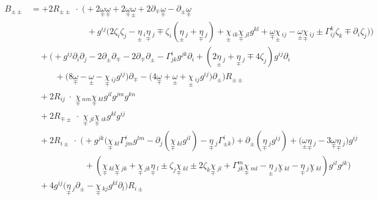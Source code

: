 \documentclass[a4paper,11pt]{article}
\numberwithin{equation}{section}
\theoremstyle{definition}
\begin{document}
\begin{align*}
    B_{\pm\pm} &= 
    + 2 R_{\pm\pm} \; \cdot \; \Big(
    + 2 \underset{\mp}{\omega}\underset{\mp}{\omega}
    + 2 \underset{\mp}{\omega} \underset{\pm}{\omega}
    +2 \partial_\mp\underset{\mp}{\omega} 
    - \partial_\pm \underset{\mp}{\omega}\\
     &\quad \quad \quad \quad \quad \quad \; \;
    + g^{ij} \big(2 \zeta_i \zeta_j
    - \underset{\pm}{\eta}\,_{i} \underset{\mp}{\eta}\,_{ j}
    \mp  \zeta_i(\underset{\pm}{\eta}\,_{ j}+\underset{\mp}{\eta}\,_j)
    + \underset{\pm}{\chi}\,_{ik} \underset{\mp}{\chi}\,_{jl}g^{kl}
    + \underset{\mp}{\omega} \underset{\pm}{\chi}\,_{ij}
    - \underset{\pm}{\omega} \underset{\mp}{\chi}\,_{ij}
    \pm \Gamma_{ij}^k \zeta_k 
    \mp \partial_i\zeta_j \big)
    \Big)\\
    &\quad 
    +  \Big(
    + g^{ij}\partial_i \partial_j
    -2 \partial_\pm\partial_\mp
    -2 \partial_\mp \partial_\pm
    -\Gamma_{jk}^i g^{jk}\partial_i
    + (2\underset{\pm}{\eta}\,_{ j} + \underset{\mp}{\eta}\,_j \mp 4 \zeta_j) g^{ij}\partial_i\\
    &\quad \quad \;\;\;
    +\big(8 \underset{\mp}{\omega}
    -\underset{\pm}{\omega} 
    -\underset{\mp}{\chi}\,_{ij} g^{ij}\big)\partial_\mp
    -\big(4 \underset{\mp}{\omega}
    +\underset{\pm}{\omega}
    +\underset{\pm}{\chi}\,_{ij} g^{ij} \big)\partial_\pm
    \Big) R_{\pm\pm}\\
    &\quad 
    + 2 R_{ij} \; \cdot \; \underset{\mp}{\chi}\,_{nm} \underset{\mp}{\chi}\,_{kl}g^{il}g^{jm}g^{kn}  \\
    &\quad 
    + 2 R_{\mp\pm} \; \cdot \; \underset{\mp}{\chi}\,_{jl} \underset{\mp}{\chi}\,_{ik} g^{kl} g^{ij} \\
    &\quad 
    + 2 R_{i\pm}  \; \cdot \;  \Big( + g^{jk}\big( \underset{\mp}{\chi}\,_{kl}\Gamma_{jm}^i g^{lm}
     -  \partial_j(\underset{\mp}{\chi}\,_{kl}g^{il})
    -  \underset{\mp}{\eta}\,_j \Gamma_{\pm k}^i\big)
    + \partial_\pm(\underset{\mp}{\eta}\,_j g^{ij})
    + \big(\underset{\pm}{\omega} \underset{\mp}{\eta}\,_j 
    -3 \underset{\mp}{\omega} \underset{\mp}{\eta}\,_j \big)g^{ij}\\
    &\quad \quad \quad \quad \quad \quad \;
     +  (\underset{\mp}{\chi}\,_{kl} \underset{\mp}{\chi}\,_{jk}
     +  \underset{\mp}{\chi}\,_{jk} \underset{\mp}{\eta}\,_l
     \pm  \zeta_j \underset{\mp}{\chi}\,_{kl}
     \pm  2 \zeta_k \underset{\mp}{\chi}\,_{jl}
     +  \Gamma_{jk}^m \underset{\mp}{\chi}\,_{ml}
     -  \underset{\pm}{\eta}\,_j\underset{_\mp}{\chi}\,_{kl}
     - \underset{\mp}{\eta}\,_j\underset{_\mp}{\chi}\,_{kl}
     )g^{il} g^{jk}\Big)\\
    &\quad 
    +4 g^{ij} \big( \underset{\mp}{\eta}\,_j \partial_\pm - \underset{\mp}{\chi}\,_{kj} g^{kl} \partial_l \big) R_{i \pm}
\end{align*}
\end{document}
